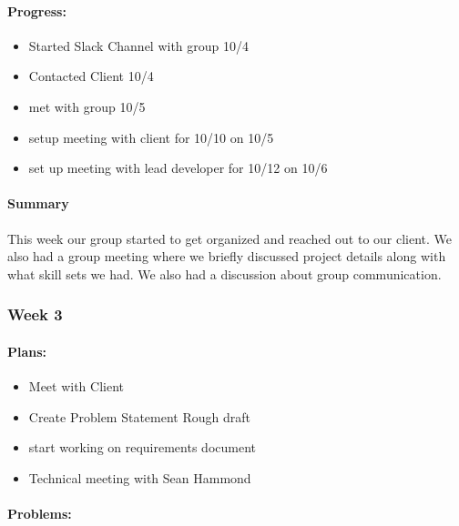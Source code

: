 \documentclass[onecolumn, draftclsnofoot,10pt, compsoc]{article}
\begin{document}
		    \paragraph{Progress:} \hfill \break
		    \begin{itemize}
		        \item Started Slack Channel with group 10/4
		        \item Contacted Client 10/4
		        \item met with group 10/5
		        \item setup meeting with client for 10/10 on 10/5
		        \item set up meeting with lead developer for 10/12 on 10/6
		    \end{itemize}
		    
		    \paragraph{Summary} \hfill \break
		         This week our group started to get organized and reached out to our client. We also had a group meeting where we briefly discussed project details along with what skill sets we had. We also had a discussion about group communication.\\
		         
		\subsubsection{Week 3}
		
		    \paragraph{Plans:} \hfill \break
		        
		        \begin{itemize}
		            \item Meet with Client
		            \item Create Problem Statement Rough draft
		            \item start working on requirements document
		            \item Technical meeting with Sean Hammond
		        \end{itemize}
		        
		    \paragraph{Problems:} \hfill \break
		    
\end{document}
